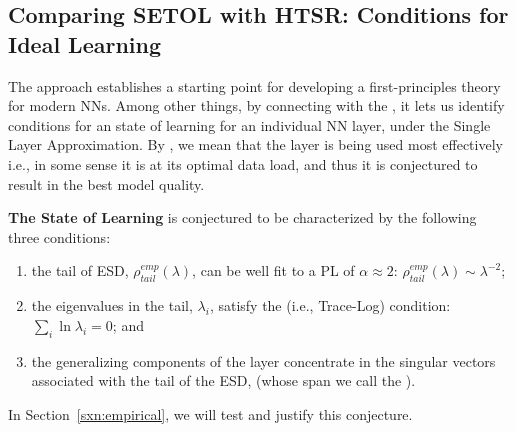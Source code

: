 \subsection{Comparing SETOL with HTSR: Conditions for Ideal Learning}
\label{sxn:ideal_learning}


The \SETOL approach establishes a starting point for developing a first-principles theory for modern NNs. %
Among other things, by connecting with the \HTSR \Phenomenology, it lets us identify conditions for an \Ideal state of learning for an individual NN layer, under the Single Layer Approximation.
By \Ideal, we mean that the layer is being used most effectively i.e., in some sense it is at its optimal data load, and thus it is conjectured to result in the best model quality.

\textbf{The \Ideal State of Learning} is conjectured to be characterized by the following three conditions:
\begin{enumerate} 
\item \label{itm:ideal_1}
  the tail of ESD, $\rho^{emp}_{tail}(\lambda)$, can be well fit to a PL of $\alpha\approx 2$: $\rho^{emp}_{tail}(\lambda)\sim\lambda^{-2}$;
\item \label{itm:ideal_2}
  the eigenvalues in the tail, $\lambda_{i}$, satisfy the \TRACELOG (i.e., Trace-Log) condition: $\sum_{i}\ln\lambda_{i}=0$; and
\item \label{itm:ideal_3}
  the generalizing components of the layer concentrate in the singular vectors associated with the tail of the ESD, (whose span we call the \EffectiveCorrelationSpace).
\end{enumerate}
In Section~\ref{sxn:empirical}, we will test and justify this conjecture.




